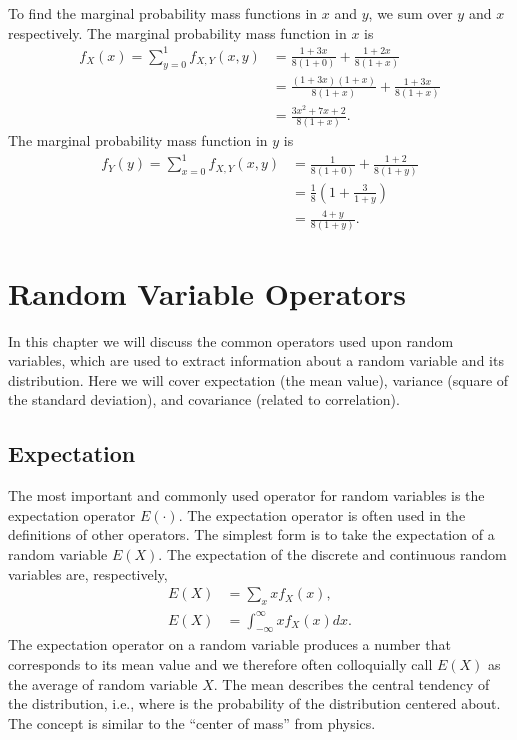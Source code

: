 To find the marginal probability mass functions in $x$ and $y$, we sum over $y$ and $x$ respectively. The marginal probability mass function in $x$ is
\begin{align}
  f_X(x) = \sum_{y=0}^1 f_{X,Y}(x,y) &= \frac{ 1 + 3x }{ 8 ( 1 + 0 ) } + \frac{ 1 + 2x }{ 8 ( 1 + x ) } \nonumber \\
  &=  \frac{ ( 1 + 3x ) ( 1 + x ) }{ 8 ( 1 + x ) } + \frac{ 1 + 3x }{ 8 ( 1 + x ) } \nonumber \\
  &=  \frac{ 3x^2 + 7x + 2 }{ 8 ( 1 + x ) } .
\end{align}
The marginal probability mass function in $y$ is
\begin{align}
  f_Y(y) = \sum_{x=0}^1 f_{X,Y}(x,y) &= \frac{ 1 }{ 8 ( 1 + 0 ) } + \frac{ 1 + 2 }{ 8 ( 1 + y ) } \nonumber \\
  &=  \frac{1}{8} \left( 1 + \frac{3}{1+y} \right) \nonumber \\
  &=  \frac{ 4 + y }{ 8 ( 1 + y ) } .
\end{align}

\section{Random Variable Operators}

In this chapter we will discuss the common operators used upon random variables, which are used to extract information about a random variable and its distribution. Here we will cover expectation (the mean value), variance (square of the standard deviation), and covariance (related to correlation).

\subsection{Expectation}

The most important and commonly used operator for random variables is the expectation operator $E(\cdot)$. The expectation operator is often used in the definitions of other operators. The simplest form is to take the expectation of a random variable $E(X)$. The expectation of the discrete and continuous random variables are, respectively,
\begin{subequations}
\begin{align}
  E(X) &= \sum_x x f_X(x), \\
  E(X) &= \int_{-\infty}^\infty x f_X(x) dx .
\end{align}
\end{subequations}
The expectation operator on a random variable produces a number that corresponds to its mean value and we therefore often colloquially call $E(X)$ as the average of random variable $X$. The mean describes the central tendency of the distribution, i.e., where is the probability of the distribution centered about. The concept is similar to the ``center of mass'' from physics.

